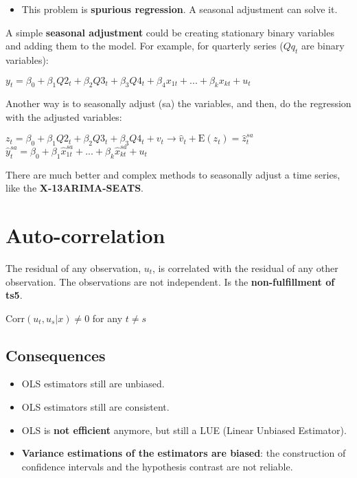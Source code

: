 \documentclass[10pt, a4paper, landscape]{extarticle}
\newcommand{\E}{\mathrm{E}}
\newcommand{\Corr}{\mathrm{Corr}}
\begin{document}
\begin{multicols}{3}
\begin{multicols}{2}
		\end{multicols}
		\begin{itemize}[leftmargin=*]
			\item This problem is \textbf{spurious regression}. A seasonal adjustment can solve it.
		\end{itemize}
		A simple \textbf{seasonal adjustment} could be creating stationary binary variables and adding them to the model. For example, for quarterly series ($Qq_t$ are binary variables):
		\begin{center}
			$y_t = \beta_0 + \beta_1 Q2_t + \beta_2 Q3_t + \beta_3 Q4_t + \beta_4 x_{1t} + ... + \beta_k x_{kt} + u_t$
		\end{center}
		Another way is to seasonally adjust (sa) the variables, and then, do the regression with the adjusted variables:
		\begin{center}
			$z_t = \beta_0 + \beta_1 Q2_t + \beta_2 Q3_t + \beta_3 Q4_t  + v_t \rightarrow \hat{v}_t + \E(z_t) = \hat{z}_t^{sa}$
			$\hat{y}_t^{sa} = \beta_0 + \beta_1 \hat{x}_{1t}^{sa} + ... + \beta_k \hat{x}_{kt}^{sa} + u_t$
		\end{center}
		There are much better and complex methods to seasonally adjust a time series, like the \textbf{X-13ARIMA-SEATS}.
\columnbreak
\section*{Auto-correlation}
	The residual of any observation, $u_t$, is correlated with the residual of any other observation. The observations are not independent. Is the \textbf{non-fulfillment of ts5}.
	\begin{center}
		$\Corr(u_t, u_s | x) \neq 0$ for any $t \neq s$
	\end{center}
	\subsection*{Consequences}
		\begin{itemize}[leftmargin=*]
			\item OLS estimators still are unbiased.
			\item OLS estimators still are consistent.
			\item OLS is \textbf{not efficient} anymore, but still a LUE (Linear Unbiased Estimator).
			\item \textbf{Variance estimations of the estimators are biased}: the construction of confidence intervals and the hypothesis contrast are not reliable.
		\end{itemize}

\end{multicols}
\end{document}
